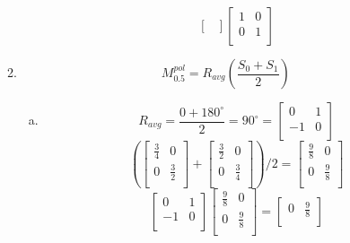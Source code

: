 \documentclass[11pt, oneside]{article}
\begin{document}
\begin{enumerate}[Problem 1:]
\begin{enumerate}[1.]
\begin{enumerate}[a)]
\[\begin{bmatrix}
              \end{bmatrix}
              \begin{bmatrix}
                1 & 0\\
                0 & 1\\
              \end{bmatrix}
            \]
        \end{enumerate}
      \item
        \[ M^{pol}_{0.5} = R_{avg}\left(\frac {S_0 + S_1} 2\right) \]
        \begin{enumerate}[a)]
        \item
          \[
            R_{avg} = \frac {0 + 180^\circ} 2 = 90^\circ = 
            \begin{bmatrix}
              0 & 1\\
              -1 & 0\\
            \end{bmatrix}
          \]
          \[
            \left(
              \begin{bmatrix}
                \frac 3 4 & 0\\
                0 & \frac 3 2\\
              \end{bmatrix}
              +
              \begin{bmatrix}
                \frac 3 2 & 0\\
                0 & \frac 3 4\\
              \end{bmatrix}
            \right)
            \Big/ 2
            =
            \begin{bmatrix}
              \frac 9 8 & 0\\
              0 & \frac 9 8\\
            \end{bmatrix}
          \]
          \[
            \begin{bmatrix}
              0 & 1\\
              -1 & 0\\
            \end{bmatrix}
            \begin{bmatrix}
              \frac 9 8 & 0\\
              0 & \frac 9 8\\
            \end{bmatrix}
            =
            \begin{bmatrix}
              0 & \frac 9 8\\

\end{bmatrix}\]
\end{enumerate}
\end{enumerate}
\end{enumerate}
\end{document}
